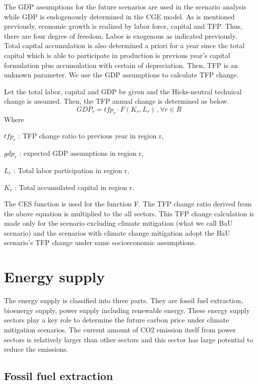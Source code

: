 \documentclass[10pt,a4paper,titlepage,dvipdfmx]{book}
\begin{document}
\begin{itemize}
The GDP assumptions for the future scenarios are used in the scenario analysis while GDP is endogenously determined in the CGE model. As is mentioned previously, economic growth is realized by labor force, capital and TFP. Thus, there are four degree of freedom. Labor is exogenous as indicated previously. Total capital accumulation is also determined a priori for a year since the total capital which is able to participate in production is previous year's capital formulation plus accumulation with certain of depreciation. Then, TFP is an unknown parameter. We use the GDP assumptions to calculate TFP change.

Let the total labor, capital and GDP be given and the Hicks-neutral technical change is assumed. Then, the TFP annual change is determined as below.
\begin{equation}
\tag{2}
GDP_{r}=tfp_{r}\cdot F\left(K_{r},L_{r}\right)\,,\forall r\in R
\end{equation}
{Where} 

$tfp_{r}$  : TFP change ratio to previous year in region r,

$gdp_{r}$  : expected GDP assumptions in region r,

$L_{r}$  : Total labor participation in region r,

$K_{r}$  : Total accumulated capital in region r.

The CES function is used for the function F. The TFP change ratio derived from the above equation is multiplied to the all sectors. This TFP change calculation is made only for the scenario excluding climate mitigation (what we call BaU scenario) and the scenarios with climate change mitigation adopt the BaU scenario's TFP change under same socioeconomic assumptions.

\section{\label{sec:EneSup}{Energy supply}}

The energy supply is classified into three parts. They are fossil fuel extraction, bioenergy supply, power supply including renewable energy. These energy supply sectors play a key role to determine the future carbon price under climate mitigation scenarios. The current amount of CO2 emission itself from power sectors is relatively larger than other sectors and this sector has large potential to reduce the emissions.

\subsection{\label{subsec:FosFueExt}Fossil fuel extraction}


\end{itemize}
\end{document}
